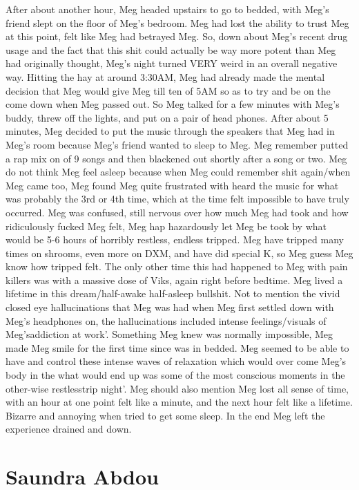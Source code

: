 \documentclass[12pt]{book}
\begin{document}
After about another hour, Meg headed upstairs to go to bedded, with Meg's friend slept on the floor of Meg's bedroom. Meg had lost the ability to trust Meg at this point, felt like Meg had betrayed Meg. So, down about Meg's recent drug usage and the fact that this shit could actually be way more potent than Meg had originally thought, Meg's night turned VERY weird in an overall negative way. Hitting the hay at around 3:30AM, Meg had already made the mental decision that Meg would give Meg till ten of 5AM so as to try and be on the come down when Meg passed out. So Meg talked for a few minutes with Meg's buddy, threw off the lights, and put on a pair of head phones. After about 5 minutes, Meg decided to put the music through the speakers that Meg had in Meg's room because Meg's friend wanted to sleep to Meg. Meg remember putted a rap mix on of 9 songs and then blackened out shortly after a song or two. Meg do not think Meg feel asleep because when Meg could remember shit again/when Meg came too, Meg found Meg quite frustrated with heard the music for what was probably the 3rd or 4th time, which at the time felt impossible to have truly occurred. Meg was confused, still nervous over how much Meg had took and how ridiculously fucked Meg felt, Meg hap hazardously let Meg be took by what would be 5-6 hours of horribly restless, endless tripped. Meg have tripped many times on shrooms, even more on DXM, and have did special K, so Meg guess Meg know how tripped felt. The only other time this had happened to Meg with pain killers was with a massive dose of Viks, again right before bedtime. Meg lived a lifetime in this dream/half-awake half-asleep bullshit. Not to mention the vivid closed eye hallucinations that Meg was had when Meg first settled down with Meg's headphones on, the hallucinations included intense feelings/visuals of Meg'saddiction at work'. Something Meg knew was normally impossible, Meg made Meg smile for the first time since was in bedded. Meg seemed to be able to have and control these intense waves of relaxation which would over come Meg's body in the what would end up was some of the most conscious moments in the other-wise restlesstrip night'. Meg should also mention Meg lost all sense of time, with an hour at one point felt like a minute, and the next hour felt like a lifetime. Bizarre and annoying when tried to get some sleep. In the end Meg left the experience drained and down.






\chapter{Saundra Abdou}
\end{document}
